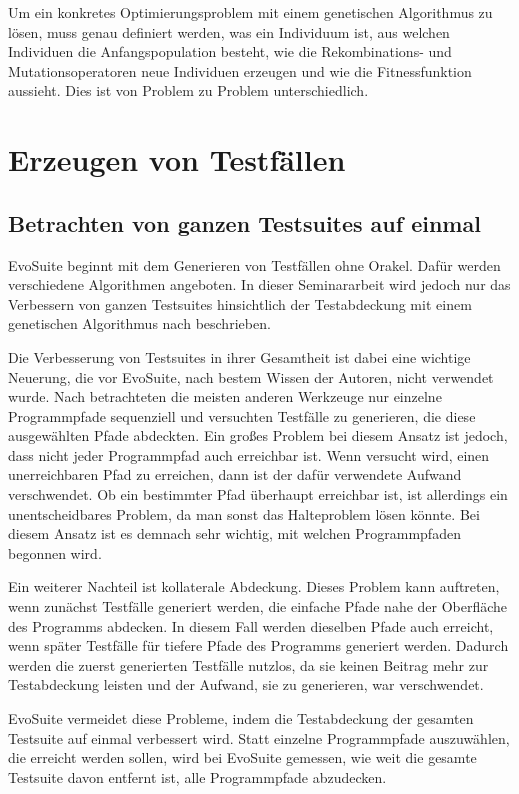 \documentclass[a4paper,11pt]{article}
\begin{document}
Um ein konkretes Optimierungsproblem mit einem genetischen Algorithmus zu lösen, muss genau definiert werden, was ein Individuum ist, aus welchen Individuen die Anfangspopulation besteht, wie die Rekombinations- und Mutationsoperatoren neue Individuen erzeugen und wie die Fitnessfunktion aussieht.
Dies ist von Problem zu Problem unterschiedlich.

\section{Erzeugen von Testfällen}
\label{sec:erzeugen_von_testfaellen}

\subsection{Betrachten von ganzen Testsuites auf einmal}

EvoSuite beginnt mit dem Generieren von Testfällen ohne Orakel.
Dafür werden verschiedene Algorithmen angeboten.
In dieser Seminararbeit wird jedoch nur das Verbessern von ganzen Testsuites hinsichtlich der Testabdeckung mit einem genetischen Algorithmus nach \cite{TSE12_EvoSuite} beschrieben.

Die Verbesserung von Testsuites in ihrer Gesamtheit ist dabei eine wichtige Neuerung, die vor EvoSuite, nach bestem Wissen der Autoren, nicht verwendet wurde.
Nach \cite{TSE12_EvoSuite} betrachteten die meisten anderen Werkzeuge nur einzelne Programmpfade sequenziell und versuchten Testfälle zu generieren, die diese ausgewählten Pfade abdeckten.
Ein großes Problem bei diesem Ansatz ist jedoch, dass nicht jeder Programmpfad auch erreichbar ist.
Wenn versucht wird, einen unerreichbaren Pfad zu erreichen, dann ist der dafür verwendete Aufwand verschwendet.
Ob ein bestimmter Pfad überhaupt erreichbar ist, ist allerdings ein unentscheidbares Problem, da man sonst das Halteproblem lösen könnte.
Bei diesem Ansatz ist es demnach sehr wichtig, mit welchen Programmpfaden begonnen wird.

Ein weiterer Nachteil ist kollaterale Abdeckung.
Dieses Problem kann auftreten, wenn zunächst Testfälle generiert werden, die einfache Pfade nahe der Oberfläche des Programms abdecken.
In diesem Fall werden dieselben Pfade auch erreicht, wenn später Testfälle für tiefere Pfade des Programms generiert werden.
Dadurch werden die zuerst generierten Testfälle nutzlos, da sie keinen Beitrag mehr zur Testabdeckung leisten und der Aufwand, sie zu generieren, war verschwendet.

EvoSuite vermeidet diese Probleme, indem die Testabdeckung der gesamten Testsuite auf einmal verbessert wird.
Statt einzelne Programmpfade auszuwählen, die erreicht werden sollen, wird bei EvoSuite gemessen, wie weit die gesamte Testsuite davon entfernt ist, alle Programmpfade abzudecken.
\end{document}
